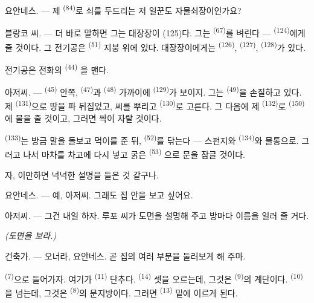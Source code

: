 \textsc{요안네스}. --- 제  \textsuperscript{(84)}로 쇠를 두드리는 저 일꾼도
자물쇠장이인가요?

\textsc{블랑코} 씨. --- 더 바로 말하면 그는 대장장이 (125)다. 그는 
\textsuperscript{(67)}를 벼린다 —  \textsuperscript{(124)}에게 줄 것이다.
그 전기공은  \textsuperscript{(51)} 지붕 위에 있다. 대장장이에게는
 \textsuperscript{(126)},  \textsuperscript{(127)},
 \textsuperscript{(128)}가 있다.

전기공은 전화의  \textsuperscript{(44)} 을 맨다.

\VUsaut{3.0mm}

\textsc{아저씨}. ---  \textsuperscript{(45)} 안쪽, 
\textsuperscript{(47)}과  \textsuperscript{(48)} 가까이에 
\textsuperscript{(129)}가 보이지. 그는  \textsuperscript{(49)}을 손질하고
있다. 제  \textsuperscript{(131)}으로 땅을 파 뒤집었고, 씨를 뿌리고
 \textsuperscript{(130)}로 고른다. 그 다음에 제 
\textsuperscript{(132)}로  \textsuperscript{(150)}에 물을 줄 것이고, 그러면
싹이 자랄 것이다.

 \textsuperscript{(133)}는 방금 말을 돌보고 먹이를 준 뒤, 
\textsuperscript{(52)}를 닦는다 — 스펀지와  \textsuperscript{(134)}와
물통으로. 그러고 나서 마차를 차고에 다시 넣고 굵은  \textsuperscript{(53)}
으로 문을 잠글 것이다.

자, 이만하면 넉넉한 설명을 들은 것 같구나.

\textsc{요안네스}. --- 예, 아저씨. 그래도 집 안을 보고 싶어요.

\textsc{아저씨}. --- 그건 내일 하자. 루포 씨가 도면을 설명해 주고 방마다 이름을 일러
줄 거다.

\VUsaut{3.0mm}
\VUsaut{2.4mm}

{\centering\textit{(도면을 보라.)}\par}
\VUsaut{2.4mm}

\textsc{건축가}. --- 오너라, 요안네스. 곧 집의 여러 부분을 둘러보게 해 주마.

 \textsuperscript{(7)}으로 들어가자. 여기가 
\textsuperscript{(11)} 단추다.  \textsuperscript{(14)} 셋을 오르는데, 그것은
 \textsuperscript{(9)}의 계단이다. 
\textsuperscript{(10)}을 넘는데, 그것은  \textsuperscript{(8)}의 문지방이다.
그러면  \textsuperscript{(13)} 밑에 이르게 된다.

